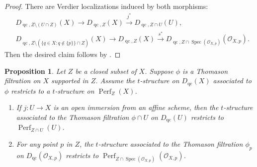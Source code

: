 \documentclass[11pt]{amsart}
\theoremstyle{plain}
\newtheorem{proposition}[theorem]{Proposition}
\theoremstyle{definition}
\numberwithin{equation}{section}
\numberwithin{theorem}{section}
\begin{document}
\begin{proof}
    There are Verdier localizations induced by both morphisms:
    \begin{displaymath}
        \begin{aligned}
            & D_{\operatorname{qc},Z\setminus (U \cap Z)}(X)  \to D_{\operatorname{qc},Z} (X) \xrightarrow{j^\ast} D_{\operatorname{qc},Z \cap U} (U), 
            \\& D_{\operatorname{qc},Z\setminus (\{ q\in X : q\not\in \overline{\{ p \}}\} \cap Z)}(X) \to D_{\operatorname{qc},Z} (X) \xrightarrow{s^\ast} D_{\operatorname{qc},Z \cap \operatorname{Spec}(\mathcal{O}_{X,p})} (\mathcal{O}_{X,p}).
        \end{aligned}
    \end{displaymath}
    Then the desired claim follows by \cite[Theorem 2.1.4]{Neeman:1996}.
\end{proof}

\begin{proposition}\label{prop:reduction_to_affines_stalks}
   Let $Z$ be a closed subset of $X$. Suppose $\phi$ is a Thomason filtration on $X$ supported in $Z$. Assume the $t$-structure on $D_{\operatorname{qc}}(X)$ associated to $\phi$ restricts to a $t$-structure on $\operatorname{Perf}_Z (X)$. 
   \begin{enumerate}
       \item If $j \colon U \to X$ is an open immersion from an affine scheme, then the $t$-structure associated to the Thomason filtration $\phi\cap U$ on $D_{\operatorname{qc}}(U)$ restricts to $\operatorname{Perf}_{Z\cap U} (U)$.
       \item For any point $p$ in $Z$, the $t$-structure associated to the Thomason filtration $\phi_p$ on $D_{\operatorname{qc}}(\mathcal{O}_{X,p})$ restricts to $\operatorname{Perf}_{Z\cap \operatorname{Spec}(\mathcal{O}_{X,p})}(\mathcal{O}_{X,p})$.
   \end{enumerate}
\end{proposition}
\end{document}
